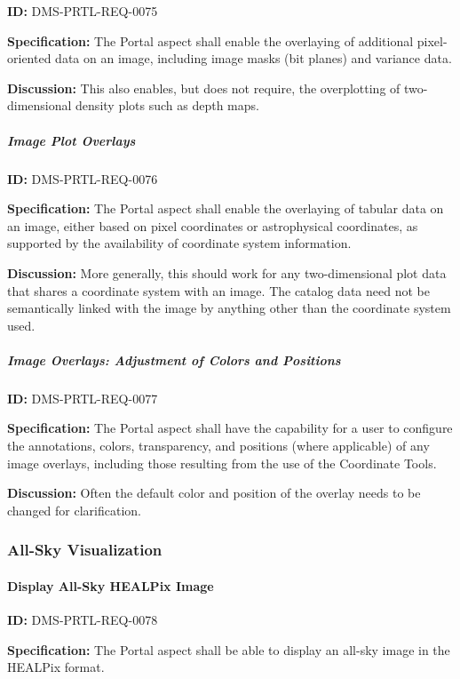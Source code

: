 \documentclass[SE,toc,lsstdraft]{lsstdoc}
\begin{document}
\label{DMS-PRTL-REQ-0075}
\textbf{ID:} DMS-PRTL-REQ-0075

\textbf{Specification:}
The Portal aspect shall enable the overlaying of additional pixel-oriented data on an image, including image masks (bit planes) and variance data.

\textbf{Discussion:}
This also enables, but does not require, the overplotting of two-dimensional density plots such as depth maps.

\subparagraph{Image Plot Overlays}\hfill  %

\label{DMS-PRTL-REQ-0076}
\textbf{ID:} DMS-PRTL-REQ-0076

\textbf{Specification:}
The Portal aspect shall enable the overlaying of tabular data on an image, either based on pixel coordinates or astrophysical coordinates, as supported by the availability of coordinate system information.

\textbf{Discussion:}
More generally, this should work for any two-dimensional plot data that shares a coordinate system with an image.  The catalog data need not be semantically linked with the image by anything other than the coordinate system used.

\subparagraph{Image Overlays: Adjustment of Colors and Positions}\hfill  %

\label{DMS-PRTL-REQ-0077}
\textbf{ID:} DMS-PRTL-REQ-0077

\textbf{Specification:}
The Portal aspect shall have the capability for a user to configure the annotations, colors, transparency, and positions (where applicable) of any image overlays, including those resulting from the use of the Coordinate Tools.

\textbf{Discussion:}
Often the default color and position of the overlay needs to be changed for clarification.

\subsubsection{All-Sky Visualization}

\paragraph{Display All-Sky HEALPix Image}\hfill  %

\label{DMS-PRTL-REQ-0078}
\textbf{ID:} DMS-PRTL-REQ-0078

\textbf{Specification:}
The Portal aspect shall be able to display an all-sky image in the HEALPix format.
\end{document}
